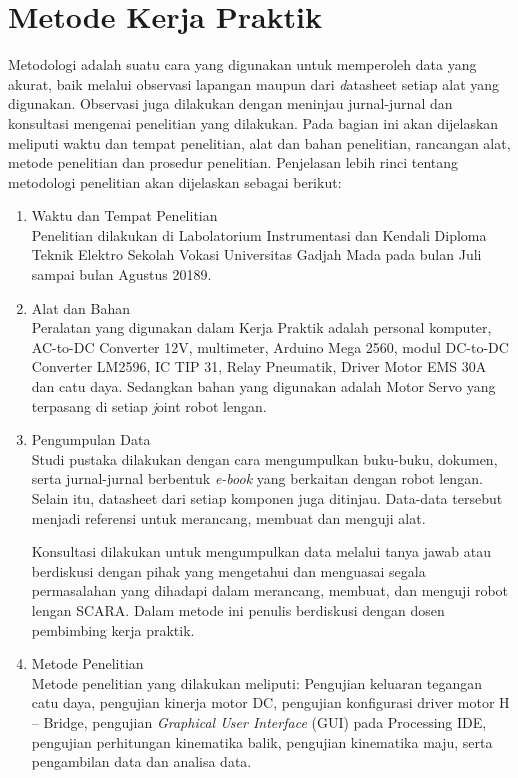 \section{Metode Kerja Praktik}
Metodologi adalah suatu cara yang digunakan untuk memperoleh data yang akurat, baik melalui observasi lapangan maupun dari \emph datasheet setiap alat yang digunakan. Observasi juga dilakukan dengan meninjau jurnal-jurnal dan konsultasi mengenai penelitian yang dilakukan. Pada bagian ini akan dijelaskan meliputi waktu dan tempat penelitian, alat dan bahan penelitian, rancangan alat, metode penelitian dan prosedur penelitian. Penjelasan lebih rinci tentang metodologi penelitian akan dijelaskan sebagai berikut: 

\begin{enumerate}
	\item Waktu dan Tempat Penelitian \\
	Penelitian dilakukan di Labolatorium Instrumentasi dan Kendali Diploma Teknik Elektro Sekolah Vokasi Universitas Gadjah Mada pada bulan Juli sampai bulan Agustus 20189.
	
	\item Alat dan Bahan \\
	Peralatan yang digunakan dalam Kerja Praktik adalah personal komputer, AC-to-DC Converter 12V, multimeter, Arduino Mega 2560, modul DC-to-DC Converter LM2596, IC TIP 31, Relay Pneumatik, Driver Motor EMS 30A dan catu daya. Sedangkan bahan yang digunakan adalah Motor Servo yang terpasang di setiap \emph joint robot lengan.
	
	\item  Pengumpulan Data \\
	Studi pustaka dilakukan dengan cara mengumpulkan buku-buku, dokumen, serta jurnal-jurnal berbentuk \emph{e-book} yang berkaitan dengan robot lengan. Selain itu, datasheet dari setiap komponen juga ditinjau. Data-data tersebut menjadi referensi untuk merancang, membuat dan menguji alat. 
	
	Konsultasi dilakukan untuk mengumpulkan data melalui tanya jawab atau berdiskusi dengan pihak yang mengetahui dan menguasai segala permasalahan yang dihadapi dalam merancang, membuat, dan menguji robot lengan SCARA. Dalam metode ini penulis berdiskusi dengan dosen pembimbing kerja praktik. 
	
	\item Metode Penelitian \\
	Metode penelitian yang dilakukan meliputi: Pengujian keluaran tegangan catu daya, pengujian kinerja motor DC, pengujian konfigurasi driver motor H – Bridge, pengujian \emph{Graphical User Interface }(GUI) pada Processing IDE, pengujian perhitungan kinematika balik, pengujian kinematika maju,  serta pengambilan data dan analisa data.
	

\end{enumerate}
